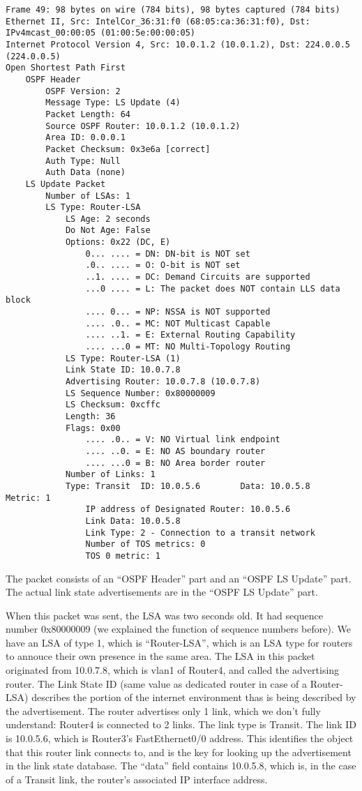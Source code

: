 \fi %

\begin{lstlisting}
Frame 49: 98 bytes on wire (784 bits), 98 bytes captured (784 bits)
Ethernet II, Src: IntelCor_36:31:f0 (68:05:ca:36:31:f0), Dst: IPv4mcast_00:00:05 (01:00:5e:00:00:05)
Internet Protocol Version 4, Src: 10.0.1.2 (10.0.1.2), Dst: 224.0.0.5 (224.0.0.5)
Open Shortest Path First
    OSPF Header
        OSPF Version: 2
        Message Type: LS Update (4)
        Packet Length: 64
        Source OSPF Router: 10.0.1.2 (10.0.1.2)
        Area ID: 0.0.0.1
        Packet Checksum: 0x3e6a [correct]
        Auth Type: Null
        Auth Data (none)
    LS Update Packet
        Number of LSAs: 1
        LS Type: Router-LSA
            LS Age: 2 seconds
            Do Not Age: False
            Options: 0x22 (DC, E)
                0... .... = DN: DN-bit is NOT set
                .0.. .... = O: O-bit is NOT set
                ..1. .... = DC: Demand Circuits are supported
                ...0 .... = L: The packet does NOT contain LLS data block
                .... 0... = NP: NSSA is NOT supported
                .... .0.. = MC: NOT Multicast Capable
                .... ..1. = E: External Routing Capability
                .... ...0 = MT: NO Multi-Topology Routing
            LS Type: Router-LSA (1)
            Link State ID: 10.0.7.8
            Advertising Router: 10.0.7.8 (10.0.7.8)
            LS Sequence Number: 0x80000009
            LS Checksum: 0xcffc
            Length: 36
            Flags: 0x00
                .... .0.. = V: NO Virtual link endpoint
                .... ..0. = E: NO AS boundary router
                .... ...0 = B: NO Area border router
            Number of Links: 1
            Type: Transit  ID: 10.0.5.6        Data: 10.0.5.8        Metric: 1
                IP address of Designated Router: 10.0.5.6
                Link Data: 10.0.5.8
                Link Type: 2 - Connection to a transit network
                Number of TOS metrics: 0
                TOS 0 metric: 1
\end{lstlisting}

The packet consists of an ``OSPF Header'' part and an ``OSPF LS Update'' part. The actual link state advertisements are in the ``OSPF LS Update'' part.

When this packet was sent, the LSA was two seconds old. It had sequence number 0x80000009 (we explained the function of sequence numbers before).
We have an LSA of type 1, which is ``Router-LSA'', which is an LSA type for routers to annouce their own presence in the  same area. The LSA in this packet originated from 10.0.7.8, which is vlan1 of Router4, and called the advertising router. The Link State ID (same value as dedicated router in case of a Router-LSA) describes the portion of the internet environment thas is being described by the advertisement. The router advertises only 1 link, which we don't fully understand: Router4 is connected to 2 links. The link type is Transit. The link ID is 10.0.5.6, which is Router3's FastEthernet0/0 address.  This identifies the object that this router link connects to, and is the key for looking up the advertisement in the link state database. The ``data'' field contains 10.0.5.8, which is, in the case of a Transit link, the router's associated IP interface address.

